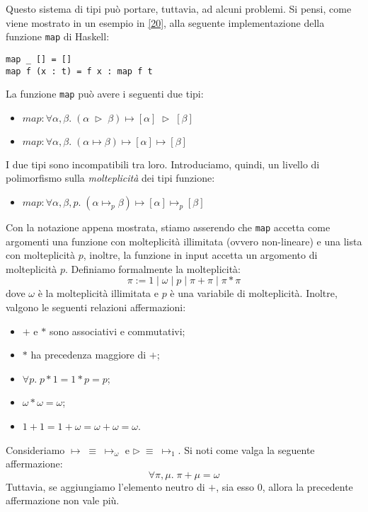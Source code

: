\documentclass[10pt,a4paper]{article}
\begin{document}
Questo sistema di tipi può portare, tuttavia, ad alcuni problemi. Si pensi, come viene mostrato in un esempio in
\hyperlink{bibl20}{[20]}, alla seguente implementazione della funzione \texttt{map} di Haskell:
\begin{lstlisting}
map _ [] = []
map f (x : t) = f x : map f t
\end{lstlisting}
La funzione \texttt{map} può avere i seguenti due tipi:
\begin{itemize}
    \item $ map : \forall \alpha, \beta. \; (\alpha \; \triangleright \; \beta) \mapsto [\alpha] \; \triangleright \; [\beta] $
    \item $ map : \forall \alpha, \beta. \; (\alpha \mapsto \beta) \mapsto [\alpha] \mapsto [\beta] $
\end{itemize}
I due tipi sono incompatibili tra loro. Introduciamo, quindi, un livello di polimorfismo sulla
\textit{molteplicità} dei tipi funzione:
\begin{itemize}
    \item $ map : \forall \alpha, \beta, p. \; (\alpha \mapsto_p \beta) \mapsto [\alpha] \mapsto_p [\beta] $
\end{itemize}
Con la notazione appena mostrata, stiamo asserendo che \texttt{map} accetta come argomenti una funzione con molteplicità
illimitata (ovvero non-lineare) e una lista con molteplicità $ p $, inoltre, la funzione in input accetta un argomento
di molteplicità $ p $. Definiamo formalmente la molteplicità:
\[ \pi := 1 \; | \; \omega \; | \; p \; | \; \pi + \pi \; | \; \pi * \pi \]
dove $ \omega $ è la molteplicità illimitata e $ p $ è una variabile di molteplicità. Inoltre, valgono le seguenti
relazioni affermazioni:
\begin{itemize}
    \item $ + $ e $ * $ sono associativi e commutativi;
    \item $ * $ ha precedenza maggiore di $ + $;
    \item $ \forall p. \; p * 1 = 1 * p = p $;
    \item $ \omega * \omega = \omega $;
    \item $ 1 + 1 = 1 + \omega = \omega + \omega = \omega $.
\end{itemize}
Consideriamo $ \mapsto \; \equiv \; \mapsto_{\omega} $ e $ \triangleright \; \equiv \; \mapsto_1 $. Si noti come valga
la seguente affermazione:
\[ \forall \pi, \mu. \; \pi + \mu = \omega \]
Tuttavia, se aggiungiamo l'elemento neutro di $ + $, sia esso $ 0 $, allora la precedente affermazione non vale più.
\end{document}

